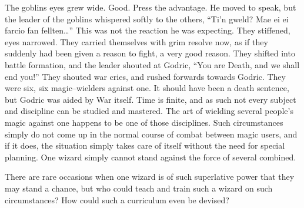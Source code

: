 The goblins eyes grew wide. Good. Press the advantage. He moved to speak, but the leader of the goblins whispered softly to the others, “Ti’n gweld? Mae ei ei farcio fan fellten…”
\SmallVSpace
This was not the reaction he was expecting. They stiffened, eyes narrowed. They carried themselves with grim resolve now, as if they suddenly had been given a reason to fight, a very good reason. They shifted into battle formation, and the leader shouted at Godric, “You are Death, and we shall end you!”
\SmallVSpace
They shouted war cries, and rushed forwards towards Godric. They were six, six magic\mbox{--}wielders against one. It should have been a death sentence, but Godric was aided by War itself.
\SmallVSpace
Time is finite, and as such not every subject and discipline can be studied and mastered. The art of wielding several people’s magic against one happens to be one of those disciplines. Such circumstances simply do not come up in the normal course of combat between magic users, and if it does, the situation simply takes care of itself without the need for special planning. One wizard simply cannot stand against the force of several combined.

There are rare occasions when one wizard is of such superlative power that they may stand a chance, but who could teach and train such a wizard on such circumstances? How could such a curriculum even be devised?

